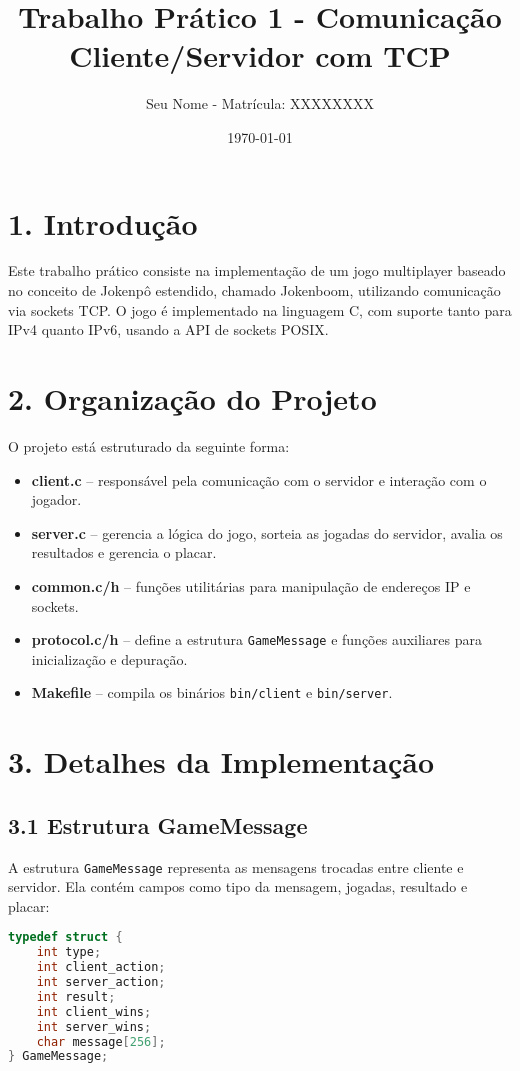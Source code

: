 \documentclass[a4paper,12pt]{article}
\title{Trabalho Prático 1 - Comunicação Cliente/Servidor com TCP}
\author{Seu Nome - Matrícula: XXXXXXXX}
\date{\today}
\begin{document}
\maketitle

\section*{1. Introdução}
Este trabalho prático consiste na implementação de um jogo multiplayer baseado no conceito de Jokenpô estendido, chamado Jokenboom, utilizando comunicação via sockets TCP. O jogo é implementado na linguagem C, com suporte tanto para IPv4 quanto IPv6, usando a API de sockets POSIX.

\section*{2. Organização do Projeto}
O projeto está estruturado da seguinte forma:
\begin{itemize}
    \item \textbf{client.c} -- responsável pela comunicação com o servidor e interação com o jogador.
    \item \textbf{server.c} -- gerencia a lógica do jogo, sorteia as jogadas do servidor, avalia os resultados e gerencia o placar.
    \item \textbf{common.c/h} -- funções utilitárias para manipulação de endereços IP e sockets.
    \item \textbf{protocol.c/h} -- define a estrutura \texttt{GameMessage} e funções auxiliares para inicialização e depuração.
    \item \textbf{Makefile} -- compila os binários \texttt{bin/client} e \texttt{bin/server}.
\end{itemize}

\section*{3. Detalhes da Implementação}

\subsection*{3.1 Estrutura GameMessage}
A estrutura \texttt{GameMessage} representa as mensagens trocadas entre cliente e servidor. Ela contém campos como tipo da mensagem, jogadas, resultado e placar:

\begin{lstlisting}[language=C, basicstyle=\ttfamily\footnotesize]
typedef struct {
    int type;
    int client_action;
    int server_action;
    int result;
    int client_wins;
    int server_wins;
    char message[256];
} GameMessage;
\end{lstlisting}
\end{document}
